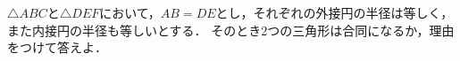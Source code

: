 \documentclass[../../main.tex]{subfiles}
\begin{document}
$\triangle ABC$と$\triangle DEF$において，$AB=DE$とし，それぞれの外接円の半径は等しく，また内接円の半径も等しいとする．
そのとき2つの三角形は合同になるか，理由をつけて答えよ．
\end{document}
